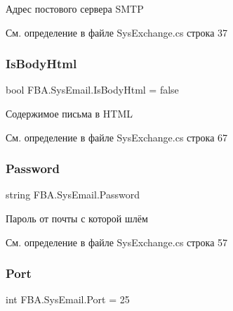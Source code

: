 Адрес постового сервера S\+M\+TP 



См. определение в файле Sys\+Exchange.\+cs строка 37

\mbox{\label{class_f_b_a_1_1_sys_email_ab13133b3f422c69bec9f9912f77bb445}} 
\subsubsection{\texorpdfstring{Is\+Body\+Html}{IsBodyHtml}}
{\footnotesize\ttfamily bool F\+B\+A.\+Sys\+Email.\+Is\+Body\+Html = false}



Содержимое письма в H\+T\+ML 



См. определение в файле Sys\+Exchange.\+cs строка 67

\mbox{\label{class_f_b_a_1_1_sys_email_a207aa6714c78d8ccfc0ec31d9176c0eb}} 
\subsubsection{\texorpdfstring{Password}{Password}}
{\footnotesize\ttfamily string F\+B\+A.\+Sys\+Email.\+Password}



Пароль от почты с которой шлём 



См. определение в файле Sys\+Exchange.\+cs строка 57

\mbox{\label{class_f_b_a_1_1_sys_email_a737e4967e6cb0c397b259b12c515d988}} 
\subsubsection{\texorpdfstring{Port}{Port}}
{\footnotesize\ttfamily int F\+B\+A.\+Sys\+Email.\+Port = 25}



